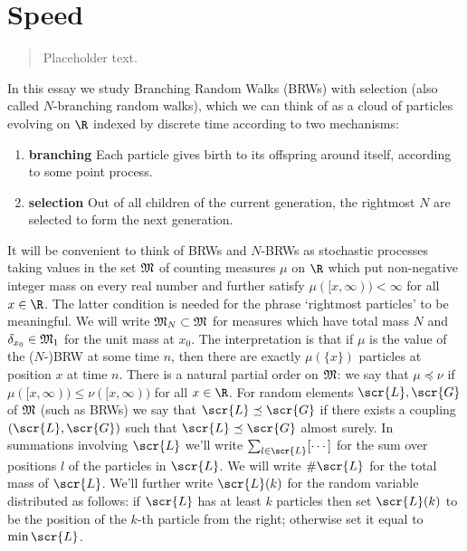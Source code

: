 \section{Speed}

\begin{quote}
{\small Placeholder text. }
\end{quote}

In this essay we study Branching Random Walks (BRWs) with selection (also called $N$-branching random walks), which we can think of as a cloud of particles evolving on $\R$ indexed by discrete time according to two mechanisms: 
\begin{enumerate}[1]
\item \vspace{-2mm}\textbf{branching} Each particle gives birth to its offspring around itself, according to some point process. \\
\item \vspace{-6mm}\textbf{selection} Out of all children of the current generation, the rightmost $N$ are selected to form the next generation. \\
\end{enumerate}
\vspace{-5mm}It will be convenient to think of BRWs and $N$-BRWs as stochastic processes taking values in the set $\frak{M}$ of counting measures $\mu$ on $\R$ which put non-negative integer mass on every real number and further satisfy $\mu([x, \infty)) < \infty$ for all $x \in \R$. The latter condition is needed for the phrase `rightmost particles' to be meaningful. We will write $\frak{M}_N \subset \frak{M}$ for measures which have total mass $N$ and $\delta_{x_0} \in \frak{M}_1$ for the unit mass at $x_0$. The interpretation is that if $\mu$ is the value of the ($N$-)BRW at some time $n$, then there are exactly $\mu(\{x\})$ particles at position $x$ at time $n$. There is a natural partial order on $\frak{M}$: we say that $\mu \preceq \nu$ if $\mu([x, \infty)) \leq \nu([x, \infty))$ for all $x \in \R$. For random elements $\scr{L}, \scr{G}$ of $\frak{M}$ (such as BRWs) we say that $\scr{L} \preceq \scr{G}$ if there exists a coupling $(\scr{L}, \scr{G})$ such that $\scr{L} \preceq \scr{G}$ almost surely. In summations involving $\scr{L}$ we'll write $\sum_{l \in \scr{L}} [\cdots]$ for the sum over positions $l$ of the particles in $\scr{L}$. We will write $\#\scr{L}$ for the total mass of $\scr{L}$. We'll further write $\scr{L}(k)$ for the random variable distributed as follows: if $\scr{L}$ has at least $k$ particles then set $\scr{L}(k)$ to be the position of the $k$-th particle from the right; otherwise set it equal to $\min \scr{L}$. \\

